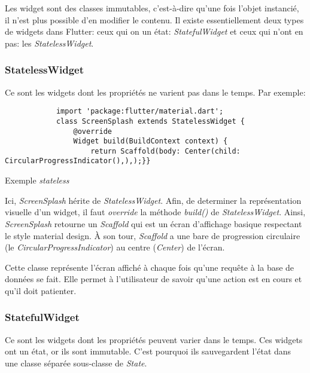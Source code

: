 Les widget sont des classes immutables, c'est-à-dire qu'une fois l'objet instancié, il n'est plus possible d'en modifier le contenu.
Il existe essentiellement deux types de widgets dans Flutter: ceux qui on un état: \textit{StatefulWidget} et ceux qui n'ont en pas:
les \textit{StatelessWidget}.

\subsubsection*{StatelessWidget}
Ce sont les widgets dont les propriétés ne varient pas dans le temps. Par exemple:

\begin{listing}[h]
    \begin{verbatim}
            import 'package:flutter/material.dart';
            class ScreenSplash extends StatelessWidget {
                @override
                Widget build(BuildContext context) {
                    return Scaffold(body: Center(child: CircularProgressIndicator(),),);}}
        \end{verbatim}
    \caption{Exemple \textit{stateless}}
    \label{code:statelessExample}
\end{listing}

Ici, \textit{ScreenSplash} hérite de \textit{StatelessWidget}. Afin, de determiner la représentation visuelle d'un widget,
il faut \textit{override} la méthode \textit{build()} de \textit{StatelessWidget}. Ainsi, \textit{ScreenSplash} retourne un \textit{Scaffold}
qui est un écran d'affichage basique respectant le style material design. À son tour,
\textit{Scaffold} a une bare de progression circulaire (le \textit{CircularProgressIndicator}) au centre (\textit{Center}) de l'écran.

Cette classe représente l'écran affiché à chaque fois qu'une requête à la base de données se fait. Elle permet à l'utilisateur de savoir qu'une action
est en cours et qu'il doit patienter.
\newpage
\subsubsection*{StatefulWidget}
Ce sont les widgets dont les propriétés peuvent varier dans le temps. Ces widgets ont un état, or ils sont immutable. C'est pourquoi ils sauvegardent
l'état dans une classe séparée  sous-classe de \textit{State}.


